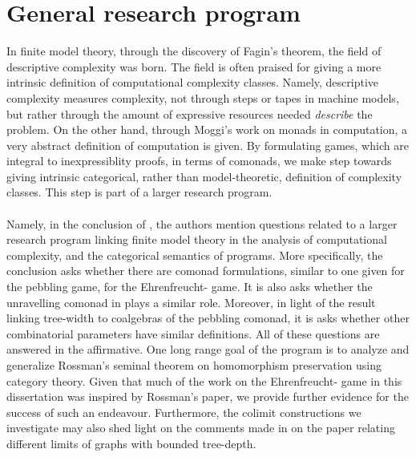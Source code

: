 \section{General research program}
In finite model theory, through the discovery of Fagin's theorem, the field of descriptive complexity was born. The field is often praised for giving a more intrinsic definition of computational complexity classes. Namely, descriptive complexity measures complexity, not through steps or tapes in machine models, but rather through the amount of expressive resources needed \textit{describe} the problem. On the other hand, through Moggi's work on monads in computation, a very abstract definition of computation is given. By formulating games, which are integral to inexpressiblity proofs, in terms of comonads, we make step towards giving intrinsic categorical, rather than model-theoretic, definition of complexity classes. This step is part of a larger research program. \\~\\
Namely, in the conclusion of \cite{Abramsky2017}, the authors mention questions related to a larger research program linking finite model theory in the analysis of computational complexity, and the categorical semantics of programs. More specifically, the conclusion asks whether there are comonad formulations, similar to one given for the pebbling game, for the Ehrenfreucht-{\Fraisse} game. It is also asks whether the unravelling comonad in \cite{Gradel2014} plays a similar role. Moreover, in light of the result linking tree-width to coalgebras of the pebbling comonad, it is asks whether other combinatorial parameters have similar definitions. All of these questions are answered in the affirmative. One long range goal of the program is to analyze and generalize Rossman's seminal theorem on homomorphism preservation using category theory. Given that much of the work on the Ehrenfreucht-{\Fraisse} game in this dissertation was inspired by Rossman's paper, we provide further evidence for the success of such an endeavour. Furthermore, the colimit constructions we investigate may also shed light on the comments made in \cite{Abramsky2017} on the paper \cite{Nesetril2013} relating different limits of graphs with bounded tree-depth. 
